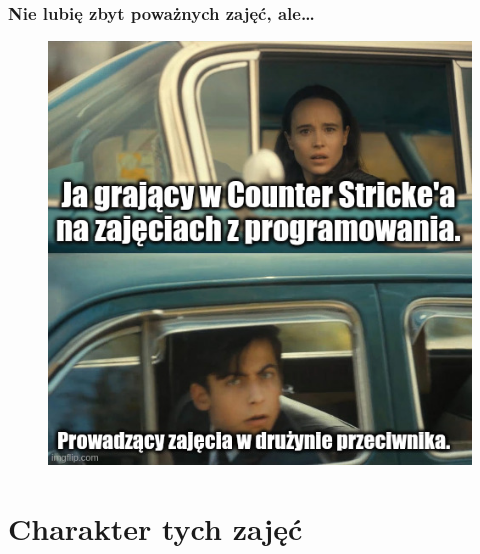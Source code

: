 \documentclass[10pt,t]{beamer}
\begin{document}
\begin{frame}
  \frametitle{Nie lubię zbyt poważnych zajęć, ale\ldots}

  \vspace{-0.5em}


  \begin{figure}

    \label{fig:Jak-to-bywa-na-zajeciach}

    \centering


    \includegraphics[scale=0.42]
    {./Presentations-pictures/Jak-to-bywa-na-zajeciach.jpeg}

  \end{figure}

\end{frame}










\section{Charakter tych zajęć}
\end{document}
